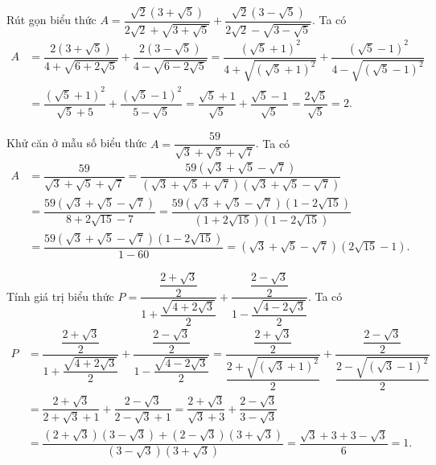 \begin{bt}%
	Rút gọn biểu thức $A=\dfrac{\sqrt{2}\left(3+\sqrt{5}\right)}{2\sqrt{2}+\sqrt{3+\sqrt{5}}}+\dfrac{\sqrt{2}\left(3-\sqrt{5}\right)}{2\sqrt{2}-\sqrt{3-\sqrt{5}}}$.
	\loigiai
	{
		Ta có
		\allowdisplaybreaks
		\begin{align*}
		A &=\dfrac{2\left(3+\sqrt{5}\right)}{4+\sqrt{6+2\sqrt{5}}}+\dfrac{2\left(3-\sqrt{5}\right)}{4-\sqrt{6-2\sqrt{5}}}
		=\dfrac{\left(\sqrt{5}+1\right)^2}{4+\sqrt{\left(\sqrt{5}+1\right)^2}}+\dfrac{\left(\sqrt{5}-1\right)^2}{4-\sqrt{\left(\sqrt{5}-1\right)^2}}\\
		&=\dfrac{\left(\sqrt{5}+1\right)^2}{\sqrt{5}+5}+\dfrac{\left(\sqrt{5}-1\right)^2}{5-\sqrt{5}}
		=\dfrac{\sqrt{5}+1}{\sqrt{5}}+\dfrac{\sqrt{5}-1}{\sqrt{5}}=\dfrac{2\sqrt{5}}{\sqrt{5}}=2.
		\end{align*}
	}
\end{bt}

\begin{bt}%
	Khử căn ở mẫu số biểu thức $A = \dfrac{59}{\sqrt{3} + \sqrt{5} + \sqrt{7}}$.
	\loigiai
	{
		Ta có
		\allowdisplaybreaks
		\begin{align*}
		A & = \dfrac{59}{\sqrt{3} + \sqrt{5} + \sqrt{7}} 
		= \dfrac{59 \left( \sqrt{3} + \sqrt{5} - \sqrt{7} \right)}{\left( \sqrt{3} + \sqrt{5} + \sqrt{7} \right) \left( \sqrt{3} + \sqrt{5} - \sqrt{7} \right)} \\
		& = \dfrac{59 \left( \sqrt{3} + \sqrt{5} - \sqrt{7} \right)}{8 + 2\sqrt{15} - 7} 
		= \dfrac{59 \left( \sqrt{3} + \sqrt{5} - \sqrt{7} \right) \left( 1 - 2\sqrt{15} \right)}{\left( 1 + 2\sqrt{15} \right) \left( 1 - 2\sqrt{15} \right)}\\
		& = \dfrac{59 \left( \sqrt{3} + \sqrt{5} - \sqrt{7} \right) \left( 1 - 2\sqrt{15} \right)}{1 - 60} 
		= \left( \sqrt{3} + \sqrt{5} - \sqrt{7} \right) \left( 2\sqrt{15} - 1 \right).
		\end{align*}
	}
\end{bt}

\begin{bt}%
	Tính giá trị biểu thức $P=\dfrac{\dfrac{2+\sqrt{3}}{2}}{1+\dfrac{\sqrt{4+2\sqrt{3}}}{2}}+\dfrac{\dfrac{2-\sqrt{3}}{2}}{1-\dfrac{\sqrt{4-2\sqrt{3}}}{2}}$.
	\loigiai
	{
		Ta có
		\allowdisplaybreaks
		\begin{align*}
		P &=\dfrac{\dfrac{2+\sqrt{3}}{2}}{1+\dfrac{\sqrt{4+2\sqrt{3}}}{2}}+\dfrac{\dfrac{2-\sqrt{3}}{2}}{1-\dfrac{\sqrt{4-2\sqrt{3}}}{2}}
		=\dfrac{\dfrac{2+\sqrt{3}}{2}}{\dfrac{2+\sqrt{\left(\sqrt{3}+1\right)^2}}{2}}+\dfrac{\dfrac{2-\sqrt{3}}{2}}{\dfrac{2-\sqrt{\left(\sqrt{3}-1\right)^2}}{2}}\\
		&=\dfrac{2+\sqrt{3}}{2+\sqrt{3}+1}+\dfrac{2-\sqrt{3}}{2-\sqrt{3}+1}
		=\dfrac{2+\sqrt{3}}{\sqrt{3}+3}+\dfrac{2-\sqrt{3}}{3-\sqrt{3}}\\
		&=\dfrac{\left(2+\sqrt{3}\right)\left(3-\sqrt{3}\right)+\left(2-\sqrt{3}\right)\left(3+\sqrt{3}\right)}{\left(3-\sqrt{3}\right)\left(3+\sqrt{3}\right)}
		=\dfrac{\sqrt{3}+3+3-\sqrt{3}}{6}=1.
		\end{align*}
	}
\end{bt}

